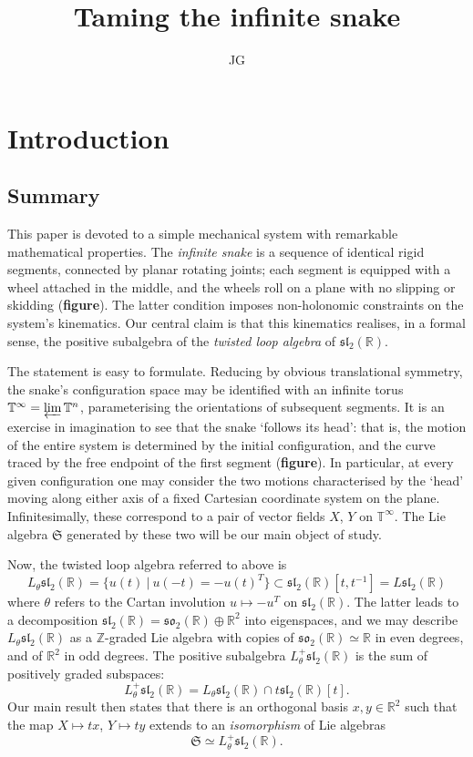 \documentclass{article}
\title{Taming the infinite snake}
\author{JG}\affil{Klara Weber Institute}
\def\fsl{\mathfrak{sl}}
\def\fso{\mathfrak{so}}
\def\fS{\mathfrak{S}}
\def\ZZ{\mathbb{Z}}
\def\RR{\mathbb{R}}
\def\TT{\mathbb{T}}
\theoremstyle{definition}
\begin{document}
\sloppy\maketitle
\tableofcontents
\section{Introduction}
\label{sec:intro}
\subsection{Summary}
This paper is devoted to a simple mechanical
system with remarkable mathematical properties.
The \emph{infinite snake} is a sequence of 
identical rigid segments, connected by
planar rotating joints; each segment is
equipped with a wheel attached in the middle,
and the wheels roll 
on a plane with no slipping
or skidding (\textbf{figure}). The latter condition 
imposes non-holonomic constraints on the system's kinematics.
Our central claim is that
this kinematics realises, in a formal sense, the positive
subalgebra of the 
\emph{twisted loop algebra} of $\fsl_2(\RR)$. 

The statement is easy to formulate. Reducing by obvious translational
symmetry, the snake's configuration space may be identified with an
infinite torus $\TT^\infty = \varprojlim \TT^n$, parameterising
the orientations of subsequent segments.
It is an exercise in imagination to see that the snake `follows its head':
that is, the motion of the entire system is determined by the initial configuration,
and the curve traced by the free endpoint of the first segment (\textbf{figure}). 
In particular, at every given configuration one may consider the two motions characterised
by the `head' moving along either axis of a fixed Cartesian coordinate system on the plane.
Infinitesimally, these correspond to a pair of vector fields $X$, $Y$ on $\TT^\infty$.
The Lie algebra $\fS$ generated by these two will be our main object of study.

Now, the twisted loop algebra referred to above is
$$
L_\theta\fsl_2(\RR) = \{ u(t)\ |\ u(-t)=-u(t)^T \} \subset \fsl_2(\RR)[t,t^{-1}] = L\fsl_2(\RR)
$$
where $\theta$ refers to the Cartan involution $u \mapsto -u^T$ on $\fsl_2(\RR)$.
The latter leads to a decomposition $\fsl_2(\RR) = \fso_2(\RR) \oplus \RR^2$ into eigenspaces,
and we may describe $L_\theta\fsl_2(\RR)$ as a $\ZZ$-graded Lie algebra with copies of 
$\fso_2(\RR)\simeq\RR$ in even degrees, and of $\RR^2$ in odd degrees.
The positive subalgebra $L_\theta^+\fsl_2(\RR)$ is the sum of positively graded subspaces:
$$
L_\theta^+\fsl_2(\RR) = L_\theta\fsl_2(\RR) \cap t \fsl_2(\RR)[t].
$$
Our main result then states that there is an orthogonal
basis $x,y\in\RR^2$ such that the map $X\mapsto tx$, $Y\mapsto ty$
extends to an \emph{isomorphism} of Lie algebras
$$\boxed{\fS \simeq L_\theta^+\fsl_2(\RR).} $$
\end{document}

